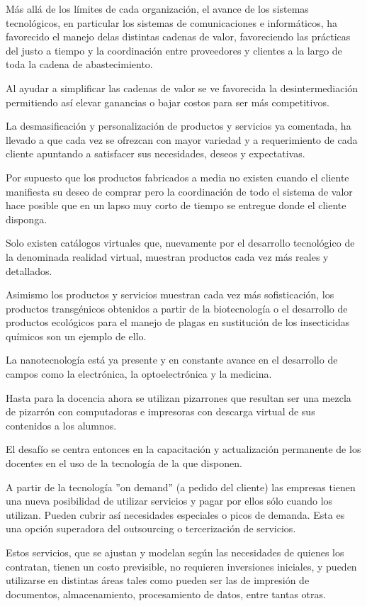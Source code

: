 \documentclass[a4paper, 12pt]{article}
\begin{document}
Más allá de los límites de cada organización, el avance de los sistemas tecnológicos, en particular los sistemas de comunicaciones e informáticos, ha favorecido el manejo delas distintas cadenas de valor, favoreciendo las prácticas del justo a tiempo y la  coordinación entre proveedores y clientes a la largo de toda la cadena de abastecimiento.

Al ayudar a simplificar las cadenas de valor se ve favorecida la desintermediación permitiendo así elevar ganancias o bajar costos para ser más competitivos.

La desmasificación y personalización de productos y servicios ya comentada, ha llevado a que cada vez se ofrezcan con mayor variedad y a requerimiento de cada cliente apuntando a satisfacer sus necesidades, deseos y expectativas.

Por supuesto que los productos fabricados a media no existen cuando el cliente manifiesta su deseo de comprar  pero la coordinación de todo el sistema de valor hace posible que en un lapso  muy corto de tiempo se entregue donde el cliente disponga.

Solo existen catálogos virtuales que, nuevamente por el desarrollo tecnológico de la denominada realidad virtual, muestran productos cada vez más reales y detallados.

Asimismo los productos y servicios muestran cada vez más sofisticación, los productos transgénicos obtenidos a partir de la biotecnología o el desarrollo de productos ecológicos para el manejo de plagas en sustitución de los insecticidas químicos son un ejemplo de ello.

La nanotecnología está ya presente y en constante avance en el desarrollo de campos como la electrónica, la optoelectrónica y la medicina.

Hasta para la docencia ahora se utilizan pizarrones que resultan ser una mezcla de pizarrón con computadoras e impresoras con descarga virtual de sus contenidos a los alumnos. 

El desafío se centra entonces en la capacitación y actualización permanente de los docentes en el uso de la tecnología de la que disponen.

A partir de la tecnología  ''on demand''  (a pedido del cliente) las empresas tienen una nueva posibilidad de utilizar servicios y pagar por ellos sólo cuando los utilizan. Pueden cubrir así necesidades especiales o picos de demanda. Esta es una opción superadora del outsourcing o tercerización de servicios.

Estos servicios, que se ajustan y modelan según las necesidades de quienes los contratan, tienen un costo previsible, no requieren inversiones iniciales, y pueden utilizarse en distintas áreas tales como pueden ser las de impresión de documentos, almacenamiento, procesamiento de datos, entre tantas otras.
\end{document}
